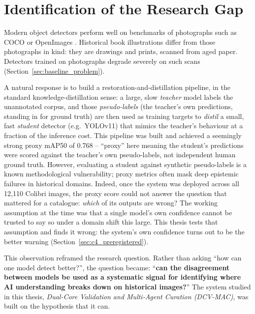 \documentclass[12pt,a4paper]{report}
\begin{document}
\section{Identification of the Research Gap}
Modern object detectors perform well on benchmarks of photographs such as COCO \cite{coco2014} or OpenImages \cite{openimages2020}. Historical book illustrations differ from those photographs in kind: they are drawings and prints, scanned from aged paper. Detectors trained on photographs degrade severely on such scans (Section~\ref{sec:baseline_problem}).

A natural response is to build a restoration-and-distillation pipeline, in the standard knowledge-distillation sense: a large, slow \textit{teacher} model labels the unannotated corpus, and those \textit{pseudo-labels} (the teacher's own predictions, standing in for ground truth) are then used as training targets to \textit{distil} a small, fast \textit{student} detector (e.g.\ YOLOv11) that mimics the teacher's behaviour at a fraction of the inference cost. This pipeline was built and achieved a seemingly strong proxy mAP50 of 0.768 -- ``proxy'' here meaning the student's predictions were scored against the teacher's own pseudo-labels, not independent human ground truth. However, evaluating a student against synthetic pseudo-labels is a known methodological vulnerability; proxy metrics often mask deep epistemic failures in historical domains. Indeed, once the system was deployed across all 12,110 Colibri images, the proxy score could not answer the question that mattered for a catalogue: \textit{which} of its outputs are wrong? The working assumption at the time was that a single model's own confidence cannot be trusted to say so under a domain shift this large. This thesis tests that assumption and finds it wrong: the system's own confidence turns out to be the better warning (Section~\ref{sec:c4_preregistered}).

This observation reframed the research question. Rather than asking ``how can one model detect better?'', the question became: ``\textbf{can the disagreement between models be used as a systematic signal for identifying where AI understanding breaks down on historical images?}'' The system studied in this thesis, \textit{Dual-Core Validation and Multi-Agent Curation (DCV-MAC)}, was built on the hypothesis that it can.
\end{document}
